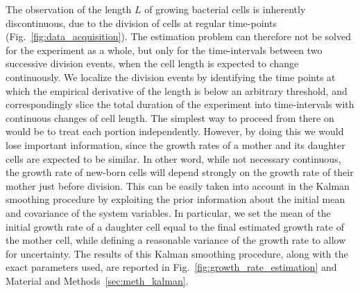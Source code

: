The observation of the length $L$ of growing bacterial cells is inherently discontinuous, due to the division of cells at regular time-points (Fig.~\ref{fig:data_acquisition}).
The estimation problem can therefore not be solved for the experiment as a whole, but only for the time-intervals between two successive division events, when the cell length is expected to change continuously.
We localize the division events by identifying the time points at which the empirical derivative of the length is below an arbitrary threshold, and correspondingly slice the total duration of the experiment into time-intervals with continuous changes of cell length.
The simplest way to proceed from there on would be to treat each portion independently.
However, by doing this we would lose important information, since the growth rates of a mother and its daughter cells are expected to be similar.
In other word, while not necessary continuous, the growth rate of new-born cells will depend strongly on the growth rate of their mother just before division.
This can be easily taken into account in the Kalman smoothing procedure by exploiting the prior information about the initial mean and covariance of the system variables.
In particular, we set the mean of the initial growth rate of a daughter cell equal to the final estimated growth rate of the mother cell, while defining a reasonable variance of the growth rate to allow for uncertainty.
The results of this Kalman smoothing procedure, along with the exact parameters used, are reported in Fig.~\ref{fig:growth_rate_estimation} and Material and Methods~\ref{sec:meth_kalman}.

